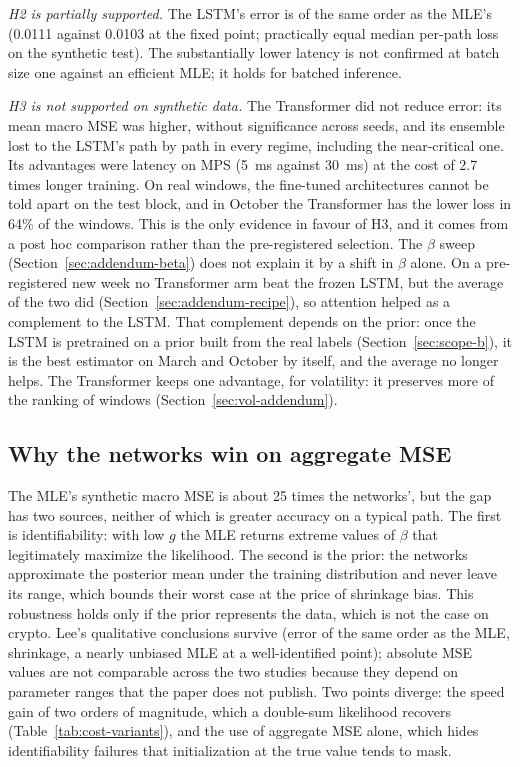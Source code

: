 \documentclass[preprint,12pt,authoryear]{elsarticle}
\begin{document}
\emph{H2 is partially supported.} The LSTM's error is of the same order as the MLE's (0.0111
against 0.0103 at the fixed point; practically equal median per-path loss on the synthetic
test). The substantially lower latency is not confirmed at batch size one against an
efficient MLE; it holds for batched inference.

\emph{H3 is not supported on synthetic data.} The Transformer did not reduce error: its mean
macro MSE was higher, without significance across seeds, and its ensemble lost to the LSTM's
path by path in every regime, including the near-critical one. Its advantages were latency
on MPS (5~ms against 30~ms) at the cost of 2.7 times longer training. On real windows, the
fine-tuned architectures cannot be told apart on the test
block, and in October the Transformer has the lower loss in 64\% of the windows. This is the
only evidence in favour of H3, and it comes from a post hoc comparison rather than the
pre-registered selection. The $\beta$ sweep (Section~\ref{sec:addendum-beta}) does not
explain it by a shift in $\beta$ alone. On a pre-registered new week no Transformer arm beat
the frozen LSTM, but the average of the two did (Section~\ref{sec:addendum-recipe}), so attention
helped as a complement to the LSTM. That complement depends on the prior: once the
LSTM is pretrained on a prior built from the real labels (Section~\ref{sec:scope-b}), it is
the best estimator on March and October by itself, and the average no longer helps. The
Transformer keeps one advantage, for volatility: it preserves more of the ranking of windows
(Section~\ref{sec:vol-addendum}).

\subsection{Why the networks win on aggregate MSE}

The MLE's synthetic macro MSE is about 25 times the networks', but the gap has two sources,
neither of which is greater accuracy on a typical path. The first is identifiability: with low
$g$ the MLE returns extreme values of $\beta$ that legitimately maximize the likelihood. The
second is the prior: the networks approximate the posterior mean under the training
distribution and never leave its range, which bounds their worst case at the price of
shrinkage bias. This robustness holds only if the prior represents the data,
which is not the case on crypto. Lee's qualitative conclusions survive (error of the same order as
the MLE, shrinkage, a nearly unbiased MLE at a well-identified point); absolute MSE values
are not comparable across the two studies because they depend on parameter ranges that the
paper does not publish. Two points diverge: the speed gain of two orders of magnitude, which
a double-sum likelihood recovers (Table~\ref{tab:cost-variants}), and the use of aggregate MSE
alone, which hides identifiability failures that initialization at
the true value tends to mask.
\end{document}
